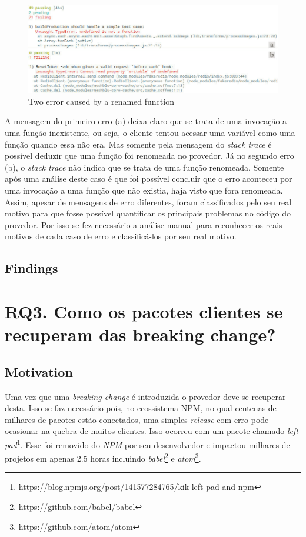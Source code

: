 \begin{figure}[!h]
    \centering
    \includegraphics[scale=0.5]{figuras/error_category.jpeg}
    \caption{Two error caused by a renamed function}
    \label{fig:error_category}
\end{figure}

A mensagem do primeiro erro (a) deixa claro que se trata de uma invocação a uma função inexistente, ou seja, o cliente tentou acessar uma variável como uma função quando essa não era. Mas somente pela mensagem do \textit{stack trace} é possível deduzir que uma função foi renomeada no provedor. Já no segundo erro (b), o \textit{stack trace} não indica que se trata de uma função renomeada. Somente após uma análise deste caso é que foi possível concluir que o erro aconteceu por uma invocação a uma função que não existia, haja visto que fora renomeada. Assim, apesar de mensagens de erro diferentes, foram classificados pelo seu real motivo para que fosse possível quantificar os principais problemas no código do provedor. Por isso se fez necessário a análise manual para reconhecer os reais motivos de cada caso de erro e classificá-los por seu real motivo.

\subsection{Findings}
\label{fin:rq2}

\section{RQ3. Como os pacotes clientes se recuperam das breaking change?}
\label{sec:rq3}

\subsection{Motivation}
\label{mot:rq3}

Uma vez que uma \textit{breaking change} é introduzida o provedor deve se recuperar desta. Isso se faz necessário pois, no ecossistema \gls{NPM}, no qual centenas de milhares de pacotes estão conectados, uma simples \textit{release} com erro pode ocasionar na quebra de muitos clientes. Isso ocorreu com um pacote chamado \textit{left-pad}\footnote{https://blog.npmjs.org/post/141577284765/kik-left-pad-and-npm}. Esse foi removido do \textit{NPM} por seu desenvolvedor e impactou milhares de projetos em apenas 2.5 horas incluindo \textit{babel}\footnote{https://github.com/babel/babel} e \textit{atom}\footnote{https://github.com/atom/atom}.

